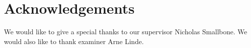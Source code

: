 \thispagestyle{plain}			%
\section*{Acknowledgements}
We would like to give a special thanks to our supervisor Nicholas Smallbone. We would also
like to thank examiner Arne Linde.



\newpage				%
\thispagestyle{empty}
\mbox{}
